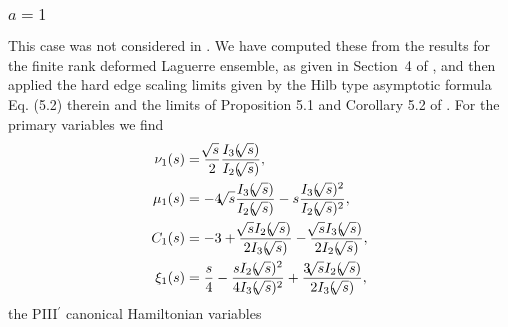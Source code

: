 \documentclass[10pt,reqno]{amsart}
\theoremstyle{plain}
\theoremstyle{definition}
\theoremstyle{remark}
\begin{document}
\subsubsection{$ a = 1 $}
This case was not considered in \cite{FW_2007}. We have computed these from the results for the finite rank
deformed Laguerre ensemble, as given in Section~4 of \cite{FW_2007}, and then applied the hard edge scaling
limits given by the Hilb type asymptotic formula Eq. (5.2) therein and the limits of Proposition 5.1 and Corollary 5.2 
of \cite{FW_2007}. For the primary variables we find
\begin{align}
  \nu _1(s)& = \frac{{ \hspace{-0.5pt} \sqrt[]{{s}}}}{2}\frac{I_{3}({ \hspace{-0.5pt} \sqrt[]{{s}}})}{I_{2}({ \hspace{-0.5pt} \sqrt[]{{s}}})},
\\
  \mu _1(s)& = -4{ \hspace{-0.5pt} \sqrt[]{{s}}}\frac{I_{3}({ \hspace{-0.5pt} \sqrt[]{{s}}})}{I_{2}({ \hspace{-0.5pt} \sqrt[]{{s}}})}-s\frac{I_{3}({ \hspace{-0.5pt} \sqrt[]{{s}}})^2}{I_{2}({ \hspace{-0.5pt} \sqrt[]{{s}}})^2},
\\
  C_1(s)& = -3+\frac{{ \hspace{-0.5pt} \sqrt[]{{s}}} I_{2}({ \hspace{-0.5pt} \sqrt[]{{s}}})}{2 I_{3}({ \hspace{-0.5pt} \sqrt[]{{s}}})}-\frac{{ \hspace{-0.5pt} \sqrt[]{{s}}} I_{3}({ \hspace{-0.5pt} \sqrt[]{{s}}})}{2 I_{2}({ \hspace{-0.5pt} \sqrt[]{{s}}})},
\\
  \xi _1(s)& = \frac{s}{4}-\frac{s I_{2}({ \hspace{-0.5pt} \sqrt[]{{s}}})^2}{4 I_{3}({ \hspace{-0.5pt} \sqrt[]{{s}}})^2}+\frac{3 { \hspace{-0.5pt} \sqrt[]{{s}}} I_{2}({ \hspace{-0.5pt} \sqrt[]{{s}}})}{2 I_{3}({ \hspace{-0.5pt} \sqrt[]{{s}}})} ,
\end{align}
the PIII$^{\prime}$ canonical Hamiltonian variables 
\end{document}

